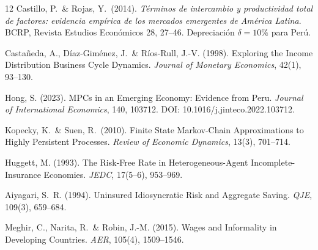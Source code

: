 \documentclass[12pt]{article}
\begin{document}
\begin{thebibliography}{12}
Castillo, P.\ \& Rojas, Y.\ (2014).
\emph{Términos de intercambio y productividad total de factores: evidencia empírica de los mercados emergentes de América Latina}.
BCRP, Revista Estudios Económicos 28, 27--46.
\newblock Depreciación $\delta = 10\%$ para Perú.

Castañeda, A., Díaz-Giménez, J.\ \& Ríos-Rull, J.-V. (1998). Exploring the Income Distribution Business Cycle Dynamics. \emph{Journal of Monetary Economics}, 42(1), 93--130.

Hong, S. (2023). MPCs in an Emerging Economy: Evidence from Peru. \emph{Journal of International Economics}, 140, 103712. DOI: 10.1016/j.jinteco.2022.103712.

Kopecky, K.\ \& Suen, R.\ (2010). Finite State Markov-Chain Approximations to Highly Persistent Processes. \emph{Review of Economic Dynamics}, 13(3), 701--714.

Huggett, M. (1993). The Risk-Free Rate in Heterogeneous-Agent Incomplete-Insurance Economies. \emph{JEDC}, 17(5--6), 953--969.

Aiyagari, S.~R. (1994). Uninsured Idiosyncratic Risk and Aggregate Saving. \emph{QJE}, 109(3), 659--684.

Meghir, C., Narita, R.\ \& Robin, J.-M. (2015). Wages and Informality in Developing Countries. \emph{AER}, 105(4), 1509--1546.

\end{thebibliography}
\end{document}
